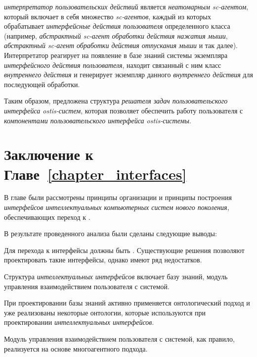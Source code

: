 \textit{интерпретатор пользовательских действий} является \textit{неатомарным sc-агентом}, который включает в себя множество \textit{sc-агентов}, каждый из которых обрабатывает \textit{интерфейсные действия пользователя} определенного класса (например, \textit{абстрактный sc-агент обработки действия нажатия мыши}, \textit{абстрактный sc-агент обработки действия отпускания мыши} и так далее). Интерпретатор реагирует на появление в базе знаний системы экземпляра \textit{интерфейсного действия пользователя}, находит связанный с ним класс \textit{внутреннего действия} и генерирует экземпляр данного \textit{внутреннего действия} для последующей обработки.

Таким образом, предложена структура \textit{решателя задач пользовательского интерфейса ostis-систем}, которая позволяет обеспечить работу пользователя с \textit{компонентами пользовательского интерфейса ostis-системы}.

\section*{Заключение к Главе~\ref{chapter_interfaces}}

В главе были рассмотрены принципы организации  и принципы построения \textit{интерфейсов интеллектуальных компьютерных систем нового поколения}, обеспечивающих переход к .

В результате проведенного анализа были сделаны следующие выводы:
\begin{textitemize}
	\item Для перехода к  интерфейсы должны быть . Существующие решения позволяют проектировать такие интерфейсы, однако имеют ряд недостатков.
	\item Структура \textit{интеллектуальных интерфейсов} включает базу знаний, модуль управления взаимодействием пользователя с системой.
	\item При проектировании базы знаний активно применяется онтологический подход и уже реализованы некоторые онтологии, которые используются при проектировании \textit{интеллектуальных интерфейсов}.
	\item Модуль управления взаимодействием пользователя с системой, как правило, реализуется на основе многоагентного подхода.
\end{textitemize} 

